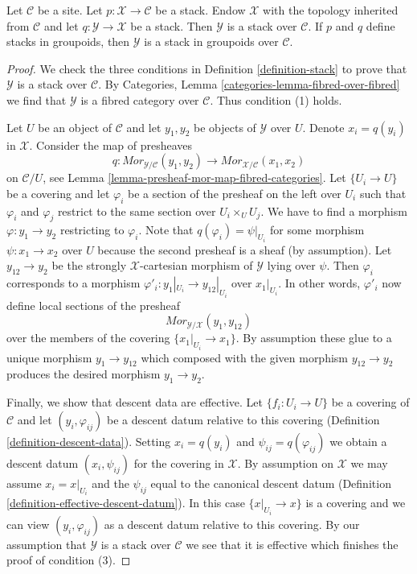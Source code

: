 \begin{lemma}
\label{lemma-stack-over-stack}
Let $\mathcal{C}$ be a site. Let $p : \mathcal{X} \to \mathcal{C}$
be a stack. Endow $\mathcal{X}$ with the topology inherited from
$\mathcal{C}$ and let $q : \mathcal{Y} \to \mathcal{X}$ be a stack.
Then $\mathcal{Y}$ is a stack over $\mathcal{C}$.
If $p$ and $q$ define stacks in groupoids, then
$\mathcal{Y}$ is a stack in groupoids over $\mathcal{C}$.
\end{lemma}

\begin{proof}
We check the three conditions in Definition \ref{definition-stack}
to prove that $\mathcal{Y}$ is a stack over $\mathcal{C}$.
By Categories, Lemma \ref{categories-lemma-fibred-over-fibred}
we find that $\mathcal{Y}$ is a fibred category over $\mathcal{C}$.
Thus condition (1) holds.

\medskip\noindent
Let $U$ be an object of $\mathcal{C}$ and let $y_1, y_2$ be objects
of $\mathcal{Y}$ over $U$. Denote $x_i = q(y_i)$ in $\mathcal{X}$.
Consider the map of presheaves
$$
q : \mathit{Mor}_{\mathcal{Y}/\mathcal{C}}(y_1, y_2)
\longrightarrow
\mathit{Mor}_{\mathcal{X}/\mathcal{C}}(x_1, x_2)
$$
on $\mathcal{C}/U$, see Lemma \ref{lemma-presheaf-mor-map-fibred-categories}.
Let $\{U_i \to U\}$ be a covering and let $\varphi_i$ be a section
of the presheaf on the left over $U_i$ such that $\varphi_i$ and
$\varphi_j$ restrict to the same section over $U_i \times_U U_j$.
We have to find a morphism $\varphi : y_1 \to y_2$ restricting to $\varphi_i$.
Note that $q(\varphi_i) = \psi|_{U_i}$ for some morphism
$\psi : x_1 \to x_2$ over $U$ because the second presheaf is a sheaf
(by assumption). Let $y_{12} \to y_2$ be the strongly $\mathcal{X}$-cartesian
morphism of $\mathcal{Y}$ lying over $\psi$. Then $\varphi_i$ corresponds
to a morphism $\varphi'_i : y_1|_{U_i} \to y_{12}|_{U_i}$ over $x_1|_{U_i}$.
In other words, $\varphi'_i$ now define local sections of the presheaf
$$
\mathit{Mor}_{\mathcal{Y}/\mathcal{X}}(y_1, y_{12})
$$
over the members of the covering $\{x_1|_{U_i} \to x_1\}$. By assumption these
glue to a unique morphism $y_1 \to y_{12}$ which composed with the given
morphism $y_{12} \to y_2$ produces the desired morphism $y_1 \to y_2$.

\medskip\noindent
Finally, we show that descent data are effective. Let $\{f_i : U_i \to U\}$
be a covering of $\mathcal{C}$ and let $(y_i, \varphi_{ij})$ be a descent
datum relative to this covering (Definition \ref{definition-descent-data}).
Setting $x_i = q(y_i)$ and $\psi_{ij} = q(\varphi_{ij})$
we obtain a descent datum $(x_i, \psi_{ij})$ for the covering in $\mathcal{X}$.
By assumption on $\mathcal{X}$ we may assume $x_i = x|_{U_i}$
and the $\psi_{ij}$ equal to the canonical descent datum
(Definition \ref{definition-effective-descent-datum}).
In this case $\{x|_{U_i} \to x\}$ is a covering and we can view
$(y_i, \varphi_{ij})$ as a descent datum relative to this covering.
By our assumption that $\mathcal{Y}$ is a stack over $\mathcal{C}$
we see that it is effective which finishes the proof of condition (3).


\end{proof}
